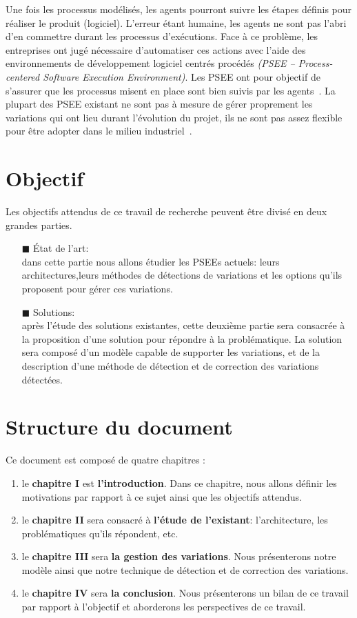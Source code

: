 Une fois les processus modélisés, les agents pourront suivre les étapes définis pour réaliser le produit (logiciel). L'erreur étant humaine, les agents ne sont pas l'abri d'en commettre durant les processus d'exécutions. Face à ce problème, les entreprises ont jugé nécessaire d'automatiser ces actions avec l'aide des environnements de développement logiciel centrés procédés \textit{(PSEE – Process-centered Software Execution Environment)}. Les PSEE ont pour objectif de s'assurer que les processus misent en place sont bien suivis par les agents~\cite{alm1}. La plupart des PSEE existant ne sont pas à mesure de gérer proprement les variations qui ont lieu durant l'évolution du projet, ils ne sont pas assez flexible pour être adopter dans le milieu industriel~\cite{kabaaj20}.\\ 


\section{Objectif}
Les objectifs attendus de ce travail de recherche peuvent être divisé en deux grandes parties. \\
\begin{itemize}
\item[\tiny{$\blacksquare$}] État de l'art: \\
dans cette partie nous allons étudier les PSEEs actuels: leurs architectures,leurs méthodes de détections de variations et les options qu'ils proposent pour gérer ces variations. \\
\item[\tiny{$\blacksquare$}] Solutions: \\
après l'étude des solutions existantes, cette deuxième partie sera consacrée à la proposition d'une solution pour répondre à la problématique. La solution sera composé d'un modèle capable de supporter les variations, et de la description d'une méthode de détection et de correction des variations détectées.
\end{itemize}


\section{Structure du document}
Ce document est composé de quatre chapitres :
\begin{enumerate}
\item le \textbf{chapitre I} est \textbf{l'introduction}. Dans ce chapitre, nous allons définir les motivations  par rapport à ce sujet ainsi que les objectifs attendus. 
\item le \textbf{chapitre II} sera consacré à \textbf{l'étude de l'existant}: l'architecture, les problématiques qu'ils répondent, etc.
\item le \textbf{chapitre III} sera \textbf{la gestion des variations}. Nous présenterons notre modèle ainsi que notre technique de détection et de correction des variations.
\item le \textbf{chapitre IV} sera \textbf{la conclusion}. Nous présenterons un bilan de ce travail par rapport à l'objectif et aborderons les perspectives de ce travail.
\end{enumerate}


